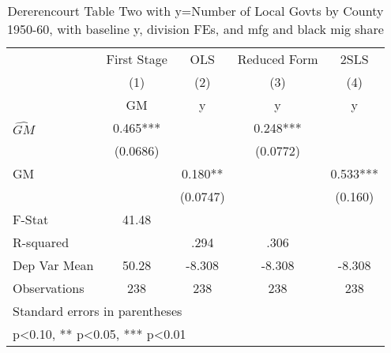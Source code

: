 \begin{table}[htbp]\centering
\def\sym#1{\ifmmode^{#1}\else\(^{#1}\)\fi}
\caption{Dererencourt Table Two with y=Number of Local Govts by County 1950-60, with baseline y, division FEs, and mfg and black mig share}
\begin{tabular}{l*{4}{c}}
\toprule
                    & First Stage   &         OLS   &Reduced Form   &        2SLS   \\
                    &\multicolumn{1}{c}{(1)}&\multicolumn{1}{c}{(2)}&\multicolumn{1}{c}{(3)}&\multicolumn{1}{c}{(4)}\\
                    &\multicolumn{1}{c}{GM}&\multicolumn{1}{c}{y}&\multicolumn{1}{c}{y}&\multicolumn{1}{c}{y}\\
\midrule
$\hat{GM}$          &       0.465***&               &       0.248***&               \\
                    &    (0.0686)   &               &    (0.0772)   &               \\
\addlinespace
GM                  &               &       0.180** &               &       0.533***\\
                    &               &    (0.0747)   &               &     (0.160)   \\
\midrule
F-Stat              &       41.48   &               &               &               \\
R-squared           &               &        .294   &        .306   &               \\
Dep Var Mean        &       50.28   &      -8.308   &      -8.308   &      -8.308   \\
Observations        &         238   &         238   &         238   &         238   \\
\bottomrule
\multicolumn{5}{l}{\footnotesize Standard errors in parentheses}\\
\multicolumn{5}{l}{\footnotesize * p<0.10, ** p<0.05, *** p<0.01}\\
\end{tabular}
\end{table}
